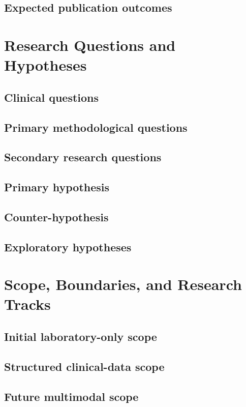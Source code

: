 \documentclass[11pt,journal,onecolumn,draftclsnofoot]{IEEEtran}
\begin{document}
\subsection{Expected publication outcomes}

\section{Research Questions and Hypotheses}
\subsection{Clinical questions}
\subsection{Primary methodological questions}
\subsection{Secondary research questions}
\subsection{Primary hypothesis}
\subsection{Counter-hypothesis}
\subsection{Exploratory hypotheses}

\section{Scope, Boundaries, and Research Tracks}
\subsection{Initial laboratory-only scope}
\subsection{Structured clinical-data scope}
\subsection{Future multimodal scope}
\end{document}
